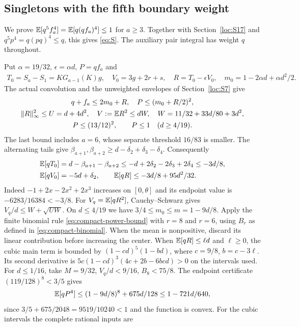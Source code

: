 \subsection{Singletons with the fifth boundary weight}\label{loc:S19}
We prove $\mathbb E[q^5f_a^4]=\mathbb E[q(qf_a)^4]\le1$ for $a\ge3$.
Together with Section~\ref{loc:S17} and $q^5p^4=q(pq)^4\le q$, this gives
\eqref{eq:S}. The auxiliary pair integral has weight $q$ throughout.

Put $\alpha=19/32$, $\epsilon=\alpha d$, $P=qf_a$ and
\begin{gather*}
 T_0=S_a-S_1=KG_{a-1}(K)g,\quad V_0=3g+2r+s,\quad
 R=T_0-\epsilon V_0,\quad m_0=1-2\alpha d+\alpha d^2/2.
\end{gather*}
The actual convolution and the unweighted envelopes of Section~\ref{loc:S7} give
\begin{gather*}
 q+f_a\le2m_0+R,\quad P\le(m_0+R/2)^2,\\
 \|R\|_\infty^2\le U=d+4d^2,\quad
 V:=\mathbb E R^2\le dW,\quad W=11/32+33d/80+3d^2,\\
 P\le(13/12)^2,\qquad P\le1\quad(d\ge4/19).
\end{gather*}
The last bound includes $a=6$, whose separate threshold $16/83$ is smaller.
The alternating tails give $\beta_{a+1},\beta_{a+2}\ge d-\delta_{2}+\delta_{3}-\delta_{4}$.
Consequently
\begin{align*}
 \mathbb E[qT_0]&=d-\beta_{a+1}-\beta_{a+2}
 \le-d+2\delta_{2}-2\delta_{3}+2\delta_{4}\le-3d/8,\\
 \mathbb E[qV_0]&=-5d+\delta_{2},\qquad
 \mathbb E[qR]\le-3d/8+95d^2/32.
\end{align*}
Indeed $-1+2x-2x^2+2x^3$ increases on $[0,\theta]$ and its endpoint
value is $-6283/16384<-3/8$.
For $V_q=\mathbb E[qR^2]$, Cauchy--Schwarz gives
$V_q/d\le W+\sqrt{UW}$.
On $d\le4/19$ we have $3/4\le m_0\le m=1-9d/8$.
Apply the finite binomial rule \eqref{eq:compact-power-bound} with
$r=8$ and $r=6$, using $B_r$ as defined in \eqref{eq:compact-binomial}.
When the mean is nonpositive, discard its linear contribution before
increasing the center. When $\mathbb E[qR]\le\ell d$ and $\ell\ge0$,
the cubic main term is bounded by $(1-cd)^5(1-bd)$,
where $c=9/8$, $b=c-3\ell$.
Its second derivative is $5c(1-cd)^3(4c+2b-6bcd)>0$ on the intervals used.
For $d\le1/16$, take $M=9/32$, $V_q/d<9/16$, $B_8<75/8$.
The endpoint certificate $(119/128)^8<3/5$ gives
\[
 \mathbb E[qP^4]\le(1-9d/8)^8+675d/128\le1-721d/640,
\]
since $3/5+675/2048=9519/10240<1$ and the function is convex.
For the cubic intervals the complete rational inputs are
